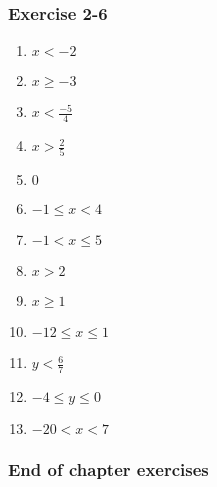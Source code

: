 {\begin{multicols}{3}
\subsubsection*{Exercise 2-6} %


\begin{enumerate}[itemsep=1pt,, label=\textbf{\arabic*}. ] 
    \item $x <-2$%
    \item $x \geq -3$%
    \item $x < \frac{-5}{4}$ %
\item $x> \frac{2}{5}$
    \item $0$%
    \item $-1 \leq x < 4$%
    \item $-1 < x \leq 5$%
    \item $x > 2$%
\item $x \geq 1$ %
\item $-12 \leq x \leq 1$ %
\item $y < \frac{6}{7}$ %
\item $-4 \leq y \leq 0$ %
\item $-20 < x<7$ %
    \end{enumerate}

\subsubsection*{End of chapter exercises} %



\end{multicols}}
